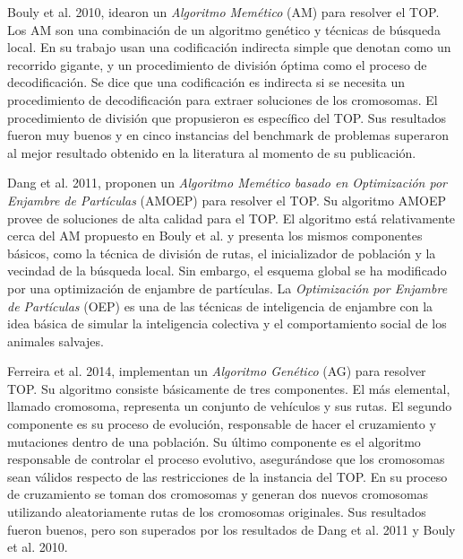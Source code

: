 \bigskip

Bouly et al. \cite{BoulyDangMoukrim} 2010, idearon un \textit{Algoritmo Memético} (AM) para resolver el TOP. Los AM son una combinación de un algoritmo genético y técnicas de búsqueda local. En su trabajo usan una codificación indirecta simple que denotan como un recorrido gigante, y un procedimiento de división óptima como el proceso de decodificación. Se dice que una codificación es indirecta si se necesita un procedimiento de decodificación para extraer soluciones de los cromosomas. El procedimiento de división que propusieron es específico del TOP. Sus resultados fueron muy buenos y en cinco instancias del benchmark de problemas superaron al mejor resultado obtenido en la literatura al momento de su publicación.

\bigskip

Dang et al. \cite{DangGuibadjMoukrim} 2011, proponen un \textit{Algoritmo Memético basado en Optimización por Enjambre de Partículas} (AMOEP) para resolver el TOP. Su algoritmo AMOEP provee de soluciones de alta calidad para el TOP. El algoritmo está relativamente cerca del AM propuesto en Bouly et al. \cite{BoulyDangMoukrim} y presenta los mismos componentes básicos, como la técnica de división de rutas, el inicializador de población y la vecindad de la búsqueda local. Sin embargo, el esquema global se ha modificado por una optimización de enjambre de partículas. La \textit{Optimización por Enjambre de Partículas} (OEP) es una de las técnicas de inteligencia de enjambre con la idea básica de simular la inteligencia colectiva y el comportamiento social de los animales salvajes.

\bigskip

Ferreira et al. \cite{FerreiraQuintasOliveiraPereiraDias} 2014, implementan un \textit{Algoritmo Genético} (AG) para resolver TOP. Su algoritmo consiste básicamente de tres componentes. El más elemental, llamado cromosoma, representa un conjunto de vehículos y sus rutas. El segundo componente es su proceso de evolución, responsable de hacer el cruzamiento y mutaciones dentro de una población. Su último componente es el algoritmo responsable de controlar el proceso evolutivo, asegurándose que los cromosomas sean válidos respecto de las restricciones de la instancia del TOP. En su proceso de cruzamiento se toman dos cromosomas y generan dos nuevos cromosomas utilizando aleatoriamente rutas de los cromosomas originales. Sus resultados fueron buenos, pero son superados por los resultados de Dang et al. \cite{DangGuibadjMoukrim} 2011 y Bouly et al. \cite{BoulyDangMoukrim} 2010.

